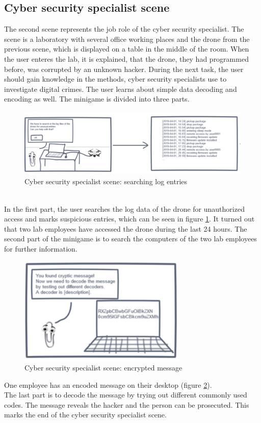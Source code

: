 \subsection{Cyber security specialist scene}
The second scene represents the job role of the cyber security specialist. The scene is a laboratory with several office working places and the drone from the previous scene, which is displayed on a table in the middle of the room. When the user enteres the lab, it is explained, that the drone, they had programmed before, was corrupted by an unknown hacker. During the next task, the user should gain knowledge in the methods, cyber security specialists use to investigate digital crimes. The user learns about simple data decoding and encoding as well. The minigame is divided into three parts. 
\begin{figure}[h!]
  \includegraphics[width=16cm]{kapitel/storyboard/cyber-analyst1.pdf}
  \centering
  \caption{Cyber security specialist scene: searching log entries}
  \label{fig:logscene}
\end{figure}
\\In the first part, the user searches the log data of the drone for unauthorized access and marks suspicious entries, which can be seen in figure \ref{fig:logscene}. It turned out that two lab employees have accessed the drone during the last 24 hours. The second part of the minigame is to search the computers of the two lab employees for further information. 
\begin{figure}[h!]
  \includegraphics[width=8cm]{kapitel/storyboard/cyber-analyst3.pdf}
  \centering
  \caption{Cyber security specialist scene: encrypted message}
  \label{fig:logscene2}
\end{figure}
One employee has an encoded message on their desktop (figure \ref{fig:logscene2}).\\ The last part is to decode the message by trying out different commonly used codes. The message reveals the hacker and the person can be prosecuted. This marks the end of the cyber security specialist scene.

